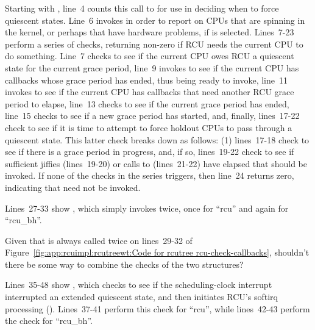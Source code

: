 Starting with , line~4 counts this call to
 for use in deciding when to force quiescent states.
Line~6 invokes  in order to report on CPUs
that are spinning in the kernel, or perhaps that have hardware problems,
if  is selected.
Lines~7-23 perform a series of checks, returning non-zero if RCU
needs the current CPU to do something.
Line~7 checks to see if the current CPU owes RCU a quiescent state for the
current grace period,
line~9 invokes  to see if
the current CPU has callbacks whose grace period has ended, thus being
ready to invoke,
line~11 invokes  to see if the current
CPU has callbacks that need another RCU grace period to elapse,
line~13 checks to see if the current grace period has ended,
line~15 checks to see if a new grace period has started,
and, finally, lines~17-22 check to see if it is time to attempt
to force holdout CPUs to pass through a quiescent state.
This latter check breaks down as follows: (1) lines~17-18 check to see
if there is a grace period in progress, and, if so, lines~19-22
check to see if sufficient jiffies (lines~19-20) or calls to
 (lines~21-22) have elapsed that
 should be invoked.
If none of the checks in the series triggers, then line~24 returns
zero, indicating that  need not be invoked.

Lines~27-33 show , which simply invokes
 twice, once for ``rcu'' and again for
``rcu\_bh''.

\QuickQuiz{}
	Given that  is always called twice
	on lines~29-32 of
	Figure~\ref{fig:app:rcuimpl:rcutreewt:Code for rcutree rcu-check-callbacks},
	shouldn't there be some way to combine the checks of the
	two structures?
 \QuickQuizEnd

Lines~35-48 show , which checks to see
if the scheduling-clock interrupt interrupted an extended quiescent
state, and then initiates RCU's softirq processing
().
Lines~37-41 perform this check for ``rcu'', while lines~42-43
perform the check for ``rcu\_bh''.

